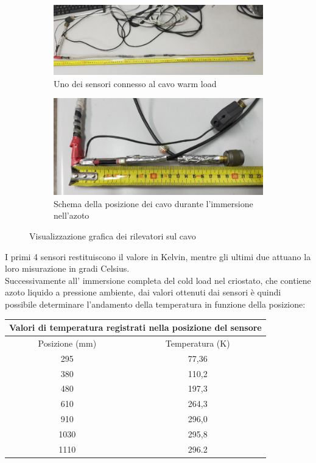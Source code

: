 \begin{figure}[H]
	\begin{subfigure}{0.49\textwidth}
		\includegraphics[width=\textwidth]{Posizione_sensori_2.png}
    		\caption{Uno dei sensori connesso al cavo warm load}
    		\label{fig:sub3}
	\end{subfigure}
	\hfill
	\begin{subfigure}{0.49\textwidth}
    		\includegraphics[width=\textwidth]{Posizione_sensori_4.png}
    		\caption{Schema della posizione dei cavo durante l'immersione nell'azoto}
    		\label{fig:sub4}
	\end{subfigure}

\caption{Visualizzazione grafica dei rilevatori sul cavo}
\label{fig:cavi}
\end{figure}


I primi 4 sensori restituiscono il valore in Kelvin, mentre gli ultimi due attuano la loro misurazione in gradi Celsius.\\
Successivamente all' immersione completa del cold load nel criostato, che contiene azoto liquido a pressione ambiente, dai valori ottenuti dai sensori è quindi possibile determinare l'andamento della temperatura in funzione della posizione: 

\begin{table}[H]
\centering

\begin{tabular}{ |c|c|  }
	\hline
	\multicolumn{2}{|c|}{Valori di temperatura registrati nella posizione del sensore} \\
	\hline
	Posizione (mm)& Temperatura (K) \\
	\hline
	295   & 77,36    \\
	380  & 110,2  \\
	480 &197,3 \\
	610    &264,3 \\
	910&   296,0  \\
	1030& 295,8  \\
	1110& 296.2  \\
	\hline
\end{tabular}

\end{table}

